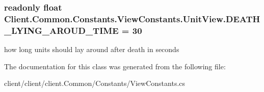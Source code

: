 \subsubsection[{D\+E\+A\+T\+H\+\_\+\+L\+Y\+I\+N\+G\+\_\+\+A\+R\+O\+U\+D\+\_\+\+T\+I\+M\+E}]{\setlength{\rightskip}{0pt plus 5cm}readonly float Client.\+Common.\+Constants.\+View\+Constants.\+Unit\+View.\+D\+E\+A\+T\+H\+\_\+\+L\+Y\+I\+N\+G\+\_\+\+A\+R\+O\+U\+D\+\_\+\+T\+I\+M\+E = 30\hspace{0.3cm}{\ttfamily [static]}}\label{classClient_1_1Common_1_1Constants_1_1ViewConstants_1_1UnitView_a239dbd2215b5a4fab82106153c295f52}


how long units should lay around after death in seconds 



The documentation for this class was generated from the following file\+:\begin{DoxyCompactItemize}
\item 
client/client/client.\+Common/\+Constants/View\+Constants.\+cs\end{DoxyCompactItemize}
